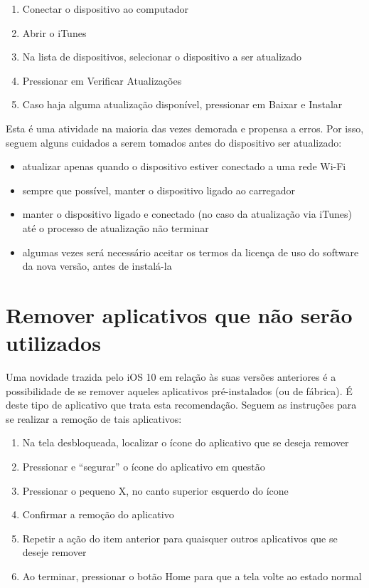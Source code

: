 \begin{enumerate}
\item Conectar o dispositivo ao computador
\item Abrir o iTunes
\item Na lista de dispositivos, selecionar o dispositivo a ser atualizado
\item Pressionar em Verificar Atualiza\c c\~oes
\item Caso haja alguma atualiza\c c\~ao dispon\'ivel, pressionar em Baixar e Instalar
\end{enumerate}

Esta \'e uma atividade na maioria das vezes demorada e propensa a erros. Por isso, seguem alguns cuidados a serem tomados antes do dispositivo ser atualizado:

\begin{itemize}
\item atualizar apenas quando o dispositivo estiver conectado a uma rede Wi-Fi
\item sempre que poss\'ivel, manter o dispositivo ligado ao carregador
\item manter o dispositivo ligado e conectado (no caso da atualiza\c c\~ao via iTunes) at\'e o processo de atualiza\c c\~ao n\~ao terminar
\item algumas vezes será necess\'ario aceitar os termos da licen\c ca de uso do software da nova vers\~ao, antes de instal\'a-la
\end{itemize}

\section{Remover aplicativos que n\~ao ser\~ao utilizados}

Uma novidade trazida pelo iOS 10 em rela\c c\~ao \`as suas vers\~oes anteriores \'e a possibilidade de se remover aqueles aplicativos pr\'e-instalados (ou de f\'abrica). \'E deste tipo de aplicativo que trata esta recomenda\c c\~ao. Seguem as instru\c c\~oes para se realizar a remo\c c\~ao de tais aplicativos:  

\begin{enumerate}
\item Na tela desbloqueada, localizar o \'icone do aplicativo que se deseja remover
\item Pressionar e ``segurar'' o \'icone do aplicativo em quest\~ao
\item Pressionar o pequeno X, no canto superior esquerdo do \'icone
\item Confirmar a remo\c c\~ao do aplicativo
\item Repetir a a\c c\~ao do item anterior para quaisquer outros aplicativos que se deseje remover
\item Ao terminar, pressionar o botão Home para que a tela volte ao estado normal
\end{enumerate}

